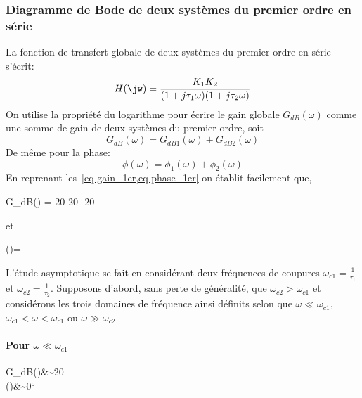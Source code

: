 \subsubsection{Diagramme de Bode de deux systèmes du premier ordre en série }
La fonction de transfert globale de deux systèmes du premier ordre en série 
s'écrit:
\begin{align}
    H(\jw)=\dfrac{K_1K_2}{(1+j\tau_1\omega)(1+j\tau_2\omega)}
    \label{eq-1er_serie}
\end{align}
On utilise la propriété du logarithme pour écrire le gain globale 
$G_{dB}(\omega)$ comme une somme de gain de deux systèmes du premier ordre, 
soit
\[
G_{dB}(\omega) = G_{dB1}(\omega) + G_{dB2}(\omega)
\]
De même pour la phase:
\[
\phi(\omega)= \phi_1(\omega) + \phi_2(\omega)
\]
En reprenant les~\cref{eq-gain_1er,eq-phase_1er} on établit facilement que,
\begin{bequation}
    G_{dB}(\omega) = 20-20
                    -20
\end{bequation}
et
\begin{bequation}
    \phi(\omega)=-\arctan{\tau_1\omega}-\arctan{\tau_2\omega}
\end{bequation}
L'étude asymptotique se fait en considérant deux fréquences de coupures 
$\omega_{c1}=\frac{1}{\tau_1}$ et $\omega_{c2}=\frac{1}{\tau_2}$.
Supposons d'abord, sans perte de généralité, que $\omega_{c2}>\omega_{c1}$ et 
considérons 
les trois domaines de fréquence ainsi définits selon que 
$\omega\ll\omega_{c1}$, $\omega_{c1}<\omega<\omega_{c1}$ ou 
$\omega\gg\omega_{c2}$
\paragraph{Pour $\omega\ll\omega_{c1}$}
\begin{bequation}
    G_{dB}(\omega)&\sim20\\
      \phi(\omega)&\sim0\si{\degree}
\end{bequation}
